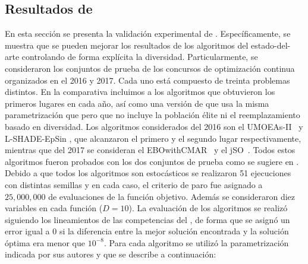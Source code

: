 \subsection{Resultados de \DEEDM{} }
En esta sección se presenta la validación experimental de \DEEDM{}.
%
Específicamente, se muestra que se pueden mejorar los resultados de los algoritmos del estado-del-arte controlando de forma explícita
la diversidad.
%
Particularmente, se consideraron los conjuntos de prueba de los concursos de optimización continua organizados en el \CEC{} 2016 y \CEC{} 2017.
%
Cada uno está compuesto de treinta problemas distintos.
%
En la comparativa incluimos a los algoritmos que obtuvieron los primeros lugares en cada año, así como una versión de \DE{} que usa la misma
parametrización que \DEEDM{} pero que no incluye la población élite ni el reemplazamiento basado en diversidad.
%
Los algoritmos considerados del \CEC{} 2016 son el UMOEAs-II~\cite{elsayed2016testing} y L-SHADE-EpSin \cite{awad2016ensemble}, que alcanzaron el primero y el segundo lugar respectivamente,
mientras que del \CEC{} 2017 se consideran el EBOwithCMAR~\cite{kumar2017improving} y el jSO~\cite{brest2017single}.
%
Todos estos algoritmos fueron probados con los dos conjuntos de prueba como se sugiere  en \cite{molina2017analysis}.
%
Debido a que todos los algoritmos son estocásticos se realizaron 51 ejecuciones con distintas semillas
y en cada caso, el criterio de paro fue asignado a $25,000,000$ de evaluaciones de la función objetivo.
%
Además se consideraron diez variables en cada función ($D=10$).
%
La evaluación de los algoritmos se realizó siguiendo los lineamientos de las competencias del \CEC{}, de forma que
se asignó un error igual a $0$ si la diferencia entre la mejor solución encontrada y la solución óptima era menor que $10^{-8}$.
%
Para cada algoritmo se utilizó la parametrización indicada por sus autores y que se describe a continuación:

